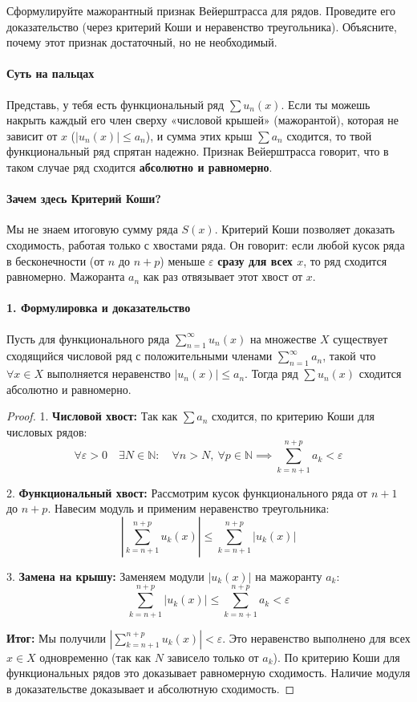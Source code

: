 {Сформулируйте мажорантный признак Вейерштрасса для рядов. Проведите его доказательство (через критерий Коши и неравенство треугольника). Объясните, почему этот признак достаточный, но не необходимый.}

\paragraph{Суть на пальцах}
Представь, у тебя есть функциональный ряд $\sum u_n(x)$. Если ты можешь накрыть каждый его член сверху «числовой крышей» (мажорантой), которая не зависит от $x$ ($|u_n(x)| \le a_n$), и сумма этих крыш $\sum a_n$ сходится, то твой функциональный ряд спрятан надежно. Признак Вейерштрасса говорит, что в таком случае ряд сходится \textbf{абсолютно и равномерно}.

\paragraph{Зачем здесь Критерий Коши?}
Мы не знаем итоговую сумму ряда $S(x)$. Критерий Коши позволяет доказать сходимость, работая только с хвостами ряда. Он говорит: если любой кусок ряда в бесконечности (от $n$ до $n+p$) меньше $\varepsilon$ \textbf{сразу для всех $x$}, то ряд сходится равномерно. Мажоранта $a_n$ как раз отвязывает этот хвост от $x$.

\paragraph{1. Формулировка и доказательство}
Пусть для функционального ряда $\sum_{n=1}^{\infty} u_n(x)$ на множестве $X$ существует сходящийся числовой ряд с положительными членами $\sum_{n=1}^{\infty} a_n$, такой что $\forall x \in X$ выполняется неравенство $|u_n(x)| \le a_n$. Тогда ряд $\sum u_n(x)$ сходится абсолютно и равномерно.

\begin{proof}
1. \textbf{Числовой хвост:} Так как $\sum a_n$ сходится, по критерию Коши для числовых рядов:
$$ \forall \varepsilon > 0 \quad \exists N \in \mathbb{N} : \quad \forall n > N, \ \forall p \in \mathbb{N} \implies \sum_{k=n+1}^{n+p} a_k < \varepsilon $$

2. \textbf{Функциональный хвост:} Рассмотрим кусок функционального ряда от $n+1$ до $n+p$. Навесим модуль и применим неравенство треугольника:
$$ \left| \sum_{k=n+1}^{n+p} u_k(x) \right| \le \sum_{k=n+1}^{n+p} |u_k(x)| $$

3. \textbf{Замена на крышу:} Заменяем модули $|u_k(x)|$ на мажоранту $a_k$:
$$ \sum_{k=n+1}^{n+p} |u_k(x)| \le \sum_{k=n+1}^{n+p} a_k < \varepsilon $$

\textbf{Итог:} Мы получили $\left| \sum_{k=n+1}^{n+p} u_k(x) \right| < \varepsilon$. Это неравенство выполнено для всех $x \in X$ одновременно (так как $N$ зависело только от $a_k$). По критерию Коши для функциональных рядов это доказывает равномерную сходимость. Наличие модуля в доказательстве доказывает и абсолютную сходимость.
\end{proof}

